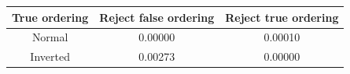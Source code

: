 \begin{tabular}{| c | c | c |}
\hline
True ordering & Reject false ordering & Reject true ordering \\
\hline
Normal & 0.00000 & 0.00010 \\
Inverted & 0.00273 & 0.00000 \\
\hline
\end{tabular}
